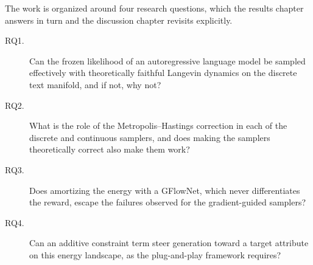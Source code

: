 The work is organized around four research questions, which the results chapter answers in turn and the discussion chapter revisits explicitly.

\begin{description}
    \item[RQ1.] Can the frozen likelihood of an autoregressive language model be sampled effectively with theoretically faithful Langevin dynamics on the discrete text manifold, and if not, why not?
    \item[RQ2.] What is the role of the Metropolis--Hastings correction in each of the discrete and continuous samplers, and does making the samplers theoretically correct also make them work?
    \item[RQ3.] Does amortizing the energy with a GFlowNet, which never differentiates the reward, escape the failures observed for the gradient-guided samplers?
    \item[RQ4.] Can an additive constraint term steer generation toward a target attribute on this energy landscape, as the plug-and-play framework requires?
\end{description}

